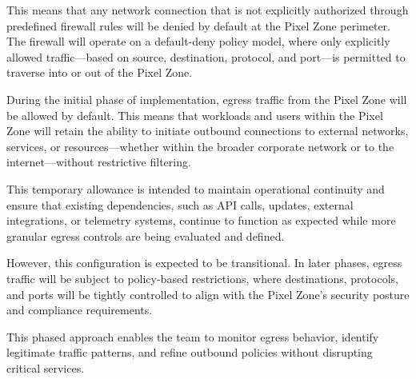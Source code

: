 This means that any network connection that is not explicitly authorized through predefined firewall rules will be denied by default at the Pixel Zone perimeter. The firewall will operate on a default-deny policy model, where only explicitly allowed traffic—based on source, destination, protocol, and port—is permitted to traverse into or out of the Pixel Zone.

During the initial phase of implementation, egress traffic from the Pixel Zone will be allowed by default. This means that workloads and users within the Pixel Zone will retain the ability to initiate outbound connections to external networks, services, or resources—whether within the broader corporate network or to the internet—without restrictive filtering.

This temporary allowance is intended to maintain operational continuity and ensure that existing dependencies, such as API calls, updates, external integrations, or telemetry systems, continue to function as expected while more granular egress controls are being evaluated and defined.

However, this configuration is expected to be transitional. In later phases, egress traffic will be subject to policy-based restrictions, where destinations, protocols, and ports will be tightly controlled to align with the Pixel Zone's security posture and compliance requirements.

This phased approach enables the team to monitor egress behavior, identify legitimate traffic patterns, and refine outbound policies without disrupting critical services.
